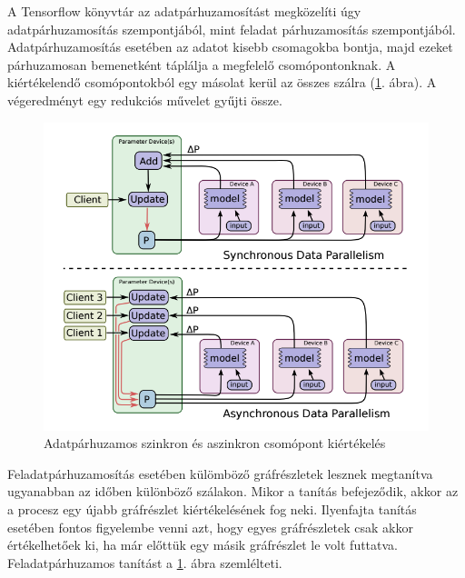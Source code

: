\documentclass[12pt, a4paper, oneside]{book}
\theoremstyle{tetel}
\begin{document}
A Tensorflow könyvtár az adatpárhuzamosítást megközelíti úgy adatpárhuzamosítás szempontjából, mint feladat párhuzamosítás szempontjából. Adatpárhuzamosítás esetében az adatot kisebb csomagokba bontja, majd ezeket párhuzamosan bemenetként táplálja a megfelelő csomópontonknak. A kiértékelendő csomópontokból egy másolat kerül az összes szálra (\ref{data_parallel_tf_model}. ábra). A végeredményt egy redukciós művelet gyűjti össze.

\begin{figure}[!htbp]
	\begin{center}
		\includegraphics[scale=0.5]{data_parallel_tf_model.png}
		\caption{Adatpárhuzamos szinkron és aszinkron csomópont kiértékelés\cite{35}}
		\label{data_parallel_tf_model}
	\end{center}
\end{figure}

Feladatpárhuzamosítás esetében külömböző gráfrészletek lesznek megtanítva ugyanabban az időben különböző szálakon. Mikor a tanítás befejeződik, akkor az a procesz egy újabb gráfrészlet kiértékelésének fog neki. Ilyenfajta tanítás esetében fontos figyelembe venni azt, hogy egyes gráfrészletek csak akkor értékelhetőek ki, ha már előttük egy másik gráfrészlet le volt futtatva. Feladatpárhuzamos tanítást a \ref{data_parallel_tf_model}. ábra szemlélteti.
\end{document}
